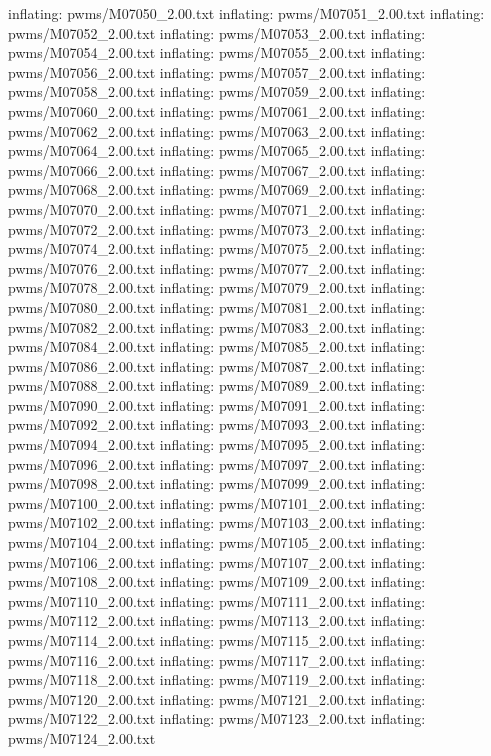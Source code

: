 \documentclass[letterpaper,10pt,english]{sphinxmanual}
\begin{document}
{\begin{sphinxVerbatim}[commandchars=\\\{\}]
  inflating: pwms/M07050\_2.00.txt
  inflating: pwms/M07051\_2.00.txt
  inflating: pwms/M07052\_2.00.txt
  inflating: pwms/M07053\_2.00.txt
  inflating: pwms/M07054\_2.00.txt
  inflating: pwms/M07055\_2.00.txt
  inflating: pwms/M07056\_2.00.txt
  inflating: pwms/M07057\_2.00.txt
  inflating: pwms/M07058\_2.00.txt
  inflating: pwms/M07059\_2.00.txt
  inflating: pwms/M07060\_2.00.txt
  inflating: pwms/M07061\_2.00.txt
  inflating: pwms/M07062\_2.00.txt
  inflating: pwms/M07063\_2.00.txt
  inflating: pwms/M07064\_2.00.txt
  inflating: pwms/M07065\_2.00.txt
  inflating: pwms/M07066\_2.00.txt
  inflating: pwms/M07067\_2.00.txt
  inflating: pwms/M07068\_2.00.txt
  inflating: pwms/M07069\_2.00.txt
  inflating: pwms/M07070\_2.00.txt
  inflating: pwms/M07071\_2.00.txt
  inflating: pwms/M07072\_2.00.txt
  inflating: pwms/M07073\_2.00.txt
  inflating: pwms/M07074\_2.00.txt
  inflating: pwms/M07075\_2.00.txt
  inflating: pwms/M07076\_2.00.txt
  inflating: pwms/M07077\_2.00.txt
  inflating: pwms/M07078\_2.00.txt
  inflating: pwms/M07079\_2.00.txt
  inflating: pwms/M07080\_2.00.txt
  inflating: pwms/M07081\_2.00.txt
  inflating: pwms/M07082\_2.00.txt
  inflating: pwms/M07083\_2.00.txt
  inflating: pwms/M07084\_2.00.txt
  inflating: pwms/M07085\_2.00.txt
  inflating: pwms/M07086\_2.00.txt
  inflating: pwms/M07087\_2.00.txt
  inflating: pwms/M07088\_2.00.txt
  inflating: pwms/M07089\_2.00.txt
  inflating: pwms/M07090\_2.00.txt
  inflating: pwms/M07091\_2.00.txt
  inflating: pwms/M07092\_2.00.txt
  inflating: pwms/M07093\_2.00.txt
  inflating: pwms/M07094\_2.00.txt
  inflating: pwms/M07095\_2.00.txt
  inflating: pwms/M07096\_2.00.txt
  inflating: pwms/M07097\_2.00.txt
  inflating: pwms/M07098\_2.00.txt
  inflating: pwms/M07099\_2.00.txt
  inflating: pwms/M07100\_2.00.txt
  inflating: pwms/M07101\_2.00.txt
  inflating: pwms/M07102\_2.00.txt
  inflating: pwms/M07103\_2.00.txt
  inflating: pwms/M07104\_2.00.txt
  inflating: pwms/M07105\_2.00.txt
  inflating: pwms/M07106\_2.00.txt
  inflating: pwms/M07107\_2.00.txt
  inflating: pwms/M07108\_2.00.txt
  inflating: pwms/M07109\_2.00.txt
  inflating: pwms/M07110\_2.00.txt
  inflating: pwms/M07111\_2.00.txt
  inflating: pwms/M07112\_2.00.txt
  inflating: pwms/M07113\_2.00.txt
  inflating: pwms/M07114\_2.00.txt
  inflating: pwms/M07115\_2.00.txt
  inflating: pwms/M07116\_2.00.txt
  inflating: pwms/M07117\_2.00.txt
  inflating: pwms/M07118\_2.00.txt
  inflating: pwms/M07119\_2.00.txt
  inflating: pwms/M07120\_2.00.txt
  inflating: pwms/M07121\_2.00.txt
  inflating: pwms/M07122\_2.00.txt
  inflating: pwms/M07123\_2.00.txt
  inflating: pwms/M07124\_2.00.txt

\end{sphinxVerbatim}}
\end{document}
